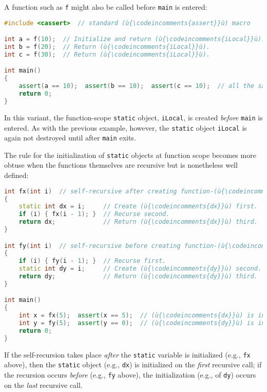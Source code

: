 A function such as \lstinline!f! might also be called before \lstinline!main!
is entered:

\begin{lstlisting}[language=C++]
#include <cassert>  // standard (ù{\codeincomments{assert}}ù) macro

int a = f(10);  // Initialize and return (ù{\codeincomments{iLocal}}ù).
int b = f(20);  // Return (ù{\codeincomments{iLocal}}ù).
int c = f(30);  // Return (ù{\codeincomments{iLocal}}ù).

int main()
{
    assert(a == 10);  assert(b == 10);  assert(c == 10);  // all the same
    return 0;
}
\end{lstlisting}
    
\noindent In this variant, the function-scope \lstinline!static! object,
\lstinline!iLocal!, is created \emph{before} \lstinline!main! is entered. As
with the previous example, however, the \lstinline!static! object
\lstinline!iLocal! is again not destroyed until after \lstinline!main! exits.

The rule for the initialization of \lstinline!static! objects at function
scope becomes more obtuse when the functions themselves are recursive
but is nonetheless well defined:

\begin{lstlisting}[language=C++]
int fx(int i)  // self-recursive after creating function-(ù{\codeincomments{static}}ù) variable, (ù{\codeincomments{dx}}ù)
{
    static int dx = i;     // Create (ù{\codeincomments{dx}}ù) first.
    if (i) { fx(i - 1); }  // Recurse second.
    return dx;             // Return (ù{\codeincomments{dx}}ù) third.
}

int fy(int i)  // self-recursive before creating function-(ù{\codeincomments{static}}ù) variable,(ù{\codeincomments{dy}}ù)
{
    if (i) { fy(i - 1); }  // Recurse first.
    static int dy = i;     // Create (ù{\codeincomments{dy}}ù) second.
    return dy;             // Return (ù{\codeincomments{dy}}ù) third.
}

int main()
{
    int x = fx(5);  assert(x == 5);  // (ù{\codeincomments{dx}}ù) is initialized before recursion.
    int y = fy(5);  assert(y == 0);  // (ù{\codeincomments{dy}}ù) is initialized after recursion.
    return 0;
}
\end{lstlisting}
    
\noindent If the self-recursion takes place \emph{after} the \lstinline!static!
variable is initialized (e.g., \lstinline!fx! above), then the
\lstinline!static! object (e.g., \lstinline!dx!) is initialized on the
\emph{first} recursive call; if the recursion occurs \emph{before}
(e.g., \lstinline!fy! above), the initialization (e.g., of \lstinline!dy!)
occurs on the \emph{last} recursive call.

